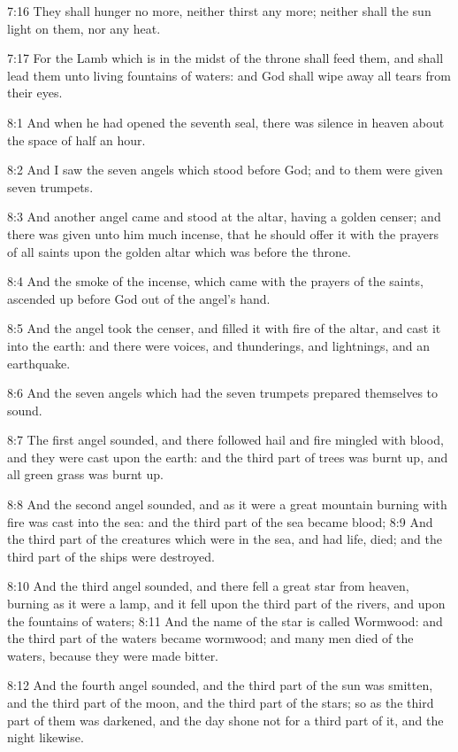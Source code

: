 7:16 They shall hunger no more, neither thirst any more; neither shall
the sun light on them, nor any heat.

7:17 For the Lamb which is in the midst of the throne shall feed them,
and shall lead them unto living fountains of waters: and God shall
wipe away all tears from their eyes.

8:1 And when he had opened the seventh seal, there was silence in
heaven about the space of half an hour.

8:2 And I saw the seven angels which stood before God; and to them
were given seven trumpets.

8:3 And another angel came and stood at the altar, having a golden
censer; and there was given unto him much incense, that he should
offer it with the prayers of all saints upon the golden altar which
was before the throne.

8:4 And the smoke of the incense, which came with the prayers of the
saints, ascended up before God out of the angel's hand.

8:5 And the angel took the censer, and filled it with fire of the
altar, and cast it into the earth: and there were voices, and
thunderings, and lightnings, and an earthquake.

8:6 And the seven angels which had the seven trumpets prepared
themselves to sound.

8:7 The first angel sounded, and there followed hail and fire mingled
with blood, and they were cast upon the earth: and the third part of
trees was burnt up, and all green grass was burnt up.

8:8 And the second angel sounded, and as it were a great mountain
burning with fire was cast into the sea: and the third part of the sea
became blood; 8:9 And the third part of the creatures which were in
the sea, and had life, died; and the third part of the ships were
destroyed.

8:10 And the third angel sounded, and there fell a great star from
heaven, burning as it were a lamp, and it fell upon the third part of
the rivers, and upon the fountains of waters; 8:11 And the name of the
star is called Wormwood: and the third part of the waters became
wormwood; and many men died of the waters, because they were made
bitter.

8:12 And the fourth angel sounded, and the third part of the sun was
smitten, and the third part of the moon, and the third part of the
stars; so as the third part of them was darkened, and the day shone
not for a third part of it, and the night likewise.

